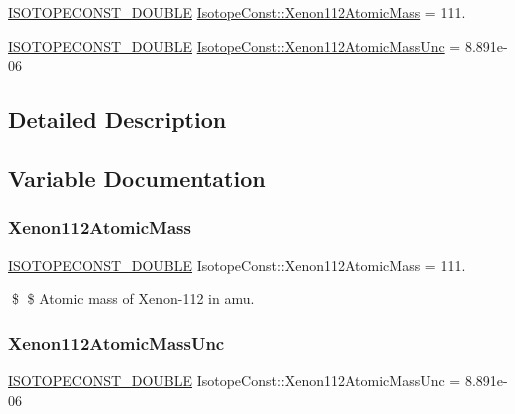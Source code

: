 \begin{DoxyCompactItemize}
\item 
\mbox{\hyperlink{group___isotope_const-_macros_ga8f45a7272ce02c0b4c65c44636ed719a}{I\+S\+O\+T\+O\+P\+E\+C\+O\+N\+S\+T\+\_\+\+D\+O\+U\+B\+LE}} \mbox{\hyperlink{group___isotope_const-_xenon-_xe112_ga84515a244f902bf2ef36237fa59f7126}{Isotope\+Const\+::\+Xenon112\+Atomic\+Mass}} = 111.
\item 
\mbox{\hyperlink{group___isotope_const-_macros_ga8f45a7272ce02c0b4c65c44636ed719a}{I\+S\+O\+T\+O\+P\+E\+C\+O\+N\+S\+T\+\_\+\+D\+O\+U\+B\+LE}} \mbox{\hyperlink{group___isotope_const-_xenon-_xe112_ga6ef62f8ad37dde9670ba8caecd280225}{Isotope\+Const\+::\+Xenon112\+Atomic\+Mass\+Unc}} = 8.\+891e-\/06
\end{DoxyCompactItemize}


\subsection{Detailed Description}


\subsection{Variable Documentation}
\mbox{\label{group___isotope_const-_xenon-_xe112_ga84515a244f902bf2ef36237fa59f7126}} 
\subsubsection{\texorpdfstring{Xenon112\+Atomic\+Mass}{Xenon112AtomicMass}}
{\footnotesize\ttfamily \mbox{\hyperlink{group___isotope_const-_macros_ga8f45a7272ce02c0b4c65c44636ed719a}{I\+S\+O\+T\+O\+P\+E\+C\+O\+N\+S\+T\+\_\+\+D\+O\+U\+B\+LE}} Isotope\+Const\+::\+Xenon112\+Atomic\+Mass = 111.}

\$ \$ Atomic mass of Xenon-\/112 in amu. \mbox{\label{group___isotope_const-_xenon-_xe112_ga6ef62f8ad37dde9670ba8caecd280225}} 
\subsubsection{\texorpdfstring{Xenon112\+Atomic\+Mass\+Unc}{Xenon112AtomicMassUnc}}
{\footnotesize\ttfamily \mbox{\hyperlink{group___isotope_const-_macros_ga8f45a7272ce02c0b4c65c44636ed719a}{I\+S\+O\+T\+O\+P\+E\+C\+O\+N\+S\+T\+\_\+\+D\+O\+U\+B\+LE}} Isotope\+Const\+::\+Xenon112\+Atomic\+Mass\+Unc = 8.\+891e-\/06}

